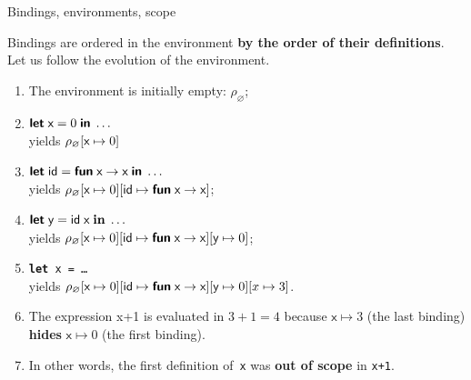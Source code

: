 %
\begin{frame}{Bindings, environments, scope}

   Bindings are ordered in the environment \textbf{by the order of
     their definitions}. Let us follow the evolution of the
   environment.
  \begin{enumerate}

    \item The environment is initially empty: \(\rho_\varnothing\);

    \item $\textsf{\textbf{let}}\; \textsf{x} = 0 \;\textsf{\textbf{in}}\; \ldots$\\
      yields $\rho_\varnothing[\textsf{x} \mapsto 0]$

    \item $\textsf{\textbf{let}} \; \textsf{id} = \textsf{\textbf{fun}} \; \textsf{x} \rightarrow
      \textsf{x} \;\textsf{\textbf{in}}\; \ldots$\\ yields
      $\rho_\varnothing[\textsf{x} \mapsto 0][\textsf{id} \mapsto \textsf{\textbf{fun}}
      \; \textsf{x} \rightarrow \textsf{x}]$;

    \item $\textsf{\textbf{let}}\; \textsf{y} = \textsf{id} \; \textsf{x} \;\textbf{in}\;
      \ldots$\\ yields
     $\rho_\varnothing[\textsf{x} \mapsto 0][\textsf{id} \mapsto \textsf{\textbf{fun}}
      \; \textsf{x} \rightarrow \textsf{x}][\textsf{y} \mapsto 0]$;

    \item \texttt{\small \textbf{let} x = \ldots}\\ yields
      $\rho_\varnothing[\textsf{x} \mapsto 0][\textsf{id} \mapsto \textsf{\textbf{fun}}
       \; \textsf{x} \rightarrow \textsf{x}][\textsf{y} \mapsto 0][x \mapsto 3]$.

    \item The expression \textsf{\small x+1} is evaluated in \(3+1=4\)
      because \(\textsf{x} \mapsto 3\) (the last binding)
      \textbf{hides} \(\textsf{x} \mapsto 0\) (the first
      binding).

    \item In other words, the first definition of~\texttt{\small x} was
      \textbf{out of scope} in \texttt{\small x+1}.

  \end{enumerate}

\end{frame}

